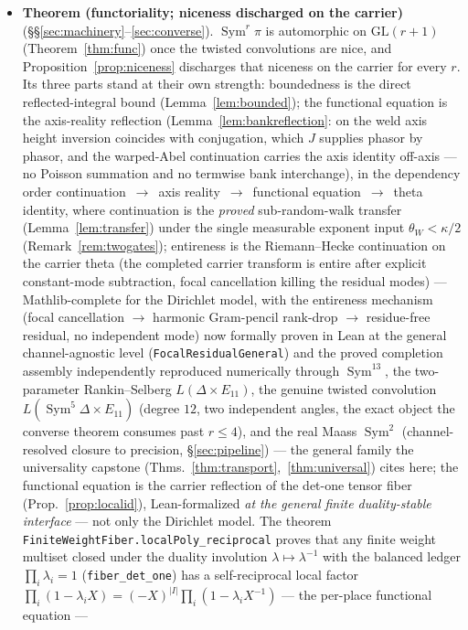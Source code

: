 \documentclass[11pt]{article}
\theoremstyle{definition}
\newcommand{\Sym}{\operatorname{Sym}}
\begin{document}
\begin{itemize}
\item \textbf{Theorem (functoriality; niceness discharged on the carrier)}
(\S\S\ref{sec:machinery}--\ref{sec:converse}). $\Sym^r\pi$ is automorphic on $\mathrm{GL}(r+1)$
(Theorem~\ref{thm:func}) once the twisted convolutions are nice, and Proposition~\ref{prop:niceness}
discharges that niceness on the carrier for every $r$. Its three parts stand at their own strength:
boundedness is the direct reflected-integral bound (Lemma~\ref{lem:bounded}); the functional equation is the
axis-reality reflection (Lemma~\ref{lem:bankreflection}: on the weld axis height inversion coincides with
conjugation, which $J$ supplies phasor by phasor, and the warped-Abel continuation carries the axis identity
off-axis --- no Poisson summation and no termwise bank interchange), in the dependency order
continuation~$\to$~axis reality~$\to$~functional equation~$\to$~theta identity, where continuation is the
\emph{proved} sub-random-walk transfer (Lemma~\ref{lem:transfer}) under the single measurable exponent input
$\theta_W<\kappa/2$ (Remark~\ref{rem:twogates}); entireness is the Riemann--Hecke
continuation on the carrier theta (the completed carrier transform is entire after explicit constant-mode
subtraction, focal cancellation killing the residual modes) --- Mathlib-complete for the Dirichlet model,
with the entireness mechanism (focal cancellation $\to$ harmonic Gram-pencil rank-drop $\to$ residue-free
residual, no independent mode) now formally proven in Lean at the general channel-agnostic level
(\texttt{FocalResidualGeneral}) and the proved completion assembly independently reproduced numerically through $\Sym^{13}$, the
two-parameter Rankin--Selberg $L(\Delta\times E_{11})$, the genuine twisted convolution $L(\Sym^5\Delta\times E_{11})$ (degree $12$, two independent angles, the exact object the converse theorem consumes past $r\le4$), and the real Maass $\Sym^2$ (channel-resolved closure to
precision, \S\ref{sec:pipeline}) --- the general family the universality capstone
(Thms.~\ref{thm:transport},~\ref{thm:universal}) cites here; the
functional equation is the carrier reflection of the det-one tensor fiber (Prop.~\ref{prop:localid}),
Lean-formalized \emph{at the general finite duality-stable interface} --- not only the Dirichlet model.
The theorem \texttt{FiniteWeightFiber.localPoly\_reciprocal} proves that any finite weight multiset
closed under the duality involution $\lambda\mapsto\lambda^{-1}$ with the balanced ledger
$\prod_i\lambda_i=1$ (\texttt{fiber\_det\_one}) has a self-reciprocal local factor
$\prod_i(1-\lambda_i X)=(-X)^{|I|}\prod_i(1-\lambda_i X^{-1})$ --- the per-place functional equation ---

\end{itemize}
\end{document}
